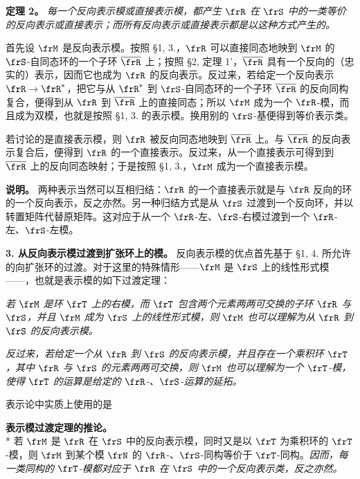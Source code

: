 \noindent\textbf{定理 2。} \emph{每一个反向表示模或直接表示模，都产生 \(\frR\) 在 \(\frS\) 中的一类等价的反向表示或直接表示；而所有反向表示或直接表示都是以这种方式产生的。}

首先设 \(\frM\) 是反向表示模。按照 §1, 3.，\(\frR\) 可以直接同态地映到 \(\frM\) 的 \(\frS\)-自同态环的一个子环 \(\overline{\frR}\) 上；按照 §2, 定理 1'，\(\overline{\frR}\) 具有一个反向的（忠实的）表示，因而它也成为 \(\frR\) 的反向表示。反过来，若给定一个反向表示 \(\frR\to\frR^*\)，把它与从 \(\frR^*\) 到 \(\frS\)-自同态环的一个子环 \(\overline{\frR}\) 的反向同构复合，便得到从 \(\frR\) 到 \(\overline{\frR}\) 上的直接同态；所以 \(\frM\) 成为一个 \(\frR\)-模，而且成为双模，也就是按照 §1, 3. 的表示模。换用别的 \(\frS\)-基便得到等价表示类。

若讨论的是直接表示模，则 \(\frR\) 被反向同态地映到 \(\overline{\frR}\) 上。与 \(\overline{\frR}\) 的反向表示复合后，便得到 \(\frR\) 的一个直接表示。反过来，从一个直接表示可得到到 \(\overline{\frR}\) 上的反向同态映射；于是按照 §1, 3.，\(\frM\) 成为一个直接表示模。

\noindent\textbf{说明。} 两种表示当然可以互相归结：\(\frR\) 的一个直接表示就是与 \(\frR\) 反向的环的一个反向表示，反之亦然。另一种归结方式是从 \(\frS\) 过渡到一个反向环，并以转置矩阵代替原矩阵。这对应于从一个 \(\frR\)-左、\(\frS\)-右模过渡到一个 \(\frR\)-左、\(\frS\)-左模。

\noindent\textbf{3. 从反向表示模过渡到扩张环上的模。} 反向表示模的优点首先基于 §1, 4. 所允许的向扩张环的过渡。对于这里的特殊情形——\(\frM\) 是 \(\frS\) 上的线性形式模——，也就是表示模的如下过渡定理：

\emph{若 \(\frM\) 是环 \(\frT\) 上的右模，而 \(\frT\) 包含两个元素两两可交换的子环 \(\frR\) 与 \(\frS\)，并且 \(\frM\) 成为 \(\frS\) 上的线性形式模，则 \(\frM\) 也可以理解为从 \(\frR\) 到 \(\frS\) 的反向表示模。}

\emph{反过来，若给定一个从 \(\frR\) 到 \(\frS\) 的反向表示模，并且存在一个乘积环 \(\frT\)，其中 \(\frR\) 与 \(\frS\) 的元素两两可交换，则 \(\frM\) 也可以理解为一个 \(\frT\)-模，使得 \(\frT\) 的运算是给定的 \(\frR\)-、\(\frS\)-运算的延拓。}

表示论中实质上使用的是

\noindent\textbf{表示模过渡定理的推论。}\\*
若 \(\frM\) 是 \(\frR\) 在 \(\frS\) 中的反向表示模，同时又是以 \(\frT\) 为乘积环的 \(\frT\)-模，则 \(\frM\) 到某个模 \(\frN\) 的 \(\frR\)-、\(\frS\)-同构等价于 \(\frT\)-同构。\emph{因而，每一类同构的 \(\frT\)-模都对应于 \(\frR\) 在 \(\frS\) 中的一个反向表示类，反之亦然。}

